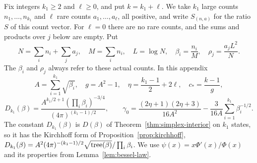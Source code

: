 Fix integers $k_1\ge2$ and $\ell\ge0$, and put $k=k_1+\ell$. We take $k_1$ large
counts $n_1,\ldots,n_{k_1}$ and $\ell$ rare counts $a_1,\ldots,a_\ell$, all
positive, and write $S_{(n,a)}$ for the ratio $S$ of this count vector. For
$\ell=0$ there are no rare counts, and the sums and products over $j$ below are
empty. Put
\[
N=\sum_in_i+\sum_ja_j,\quad M=\sum_in_i,\quad
L=\log N,\quad \beta_i=\frac{n_i}{M},\quad
\rho_j=\frac{a_jL^2}{N}.
\]
The $\beta_i$ and $\rho_j$ always refer to these actual counts. In this
appendix
\[
A=\sum_{i=1}^{k_1}\sqrt{\beta_i},\quad g=A^2-1,\quad
\eta=\frac{k_1-1}{2}+2\ell,\quad c_*=\frac{k-1}g,
\]
\[
D_{k_1}(\beta)=\frac{A^{k_1/2+1}(\prod_i\beta_i)^{-3/4}}
{(4\pi)^{(k_1-1)/2}},\qquad
\gamma_0=\frac{(2\eta+1)(2\eta+3)}{16A^2}-\frac{3}{16A}\sum_{i=1}^{k_1}\beta_i^{-1/2}.
\]
The constant $D_{k_1}(\beta)$ is $D(\beta)$ of
Theorem~\ref{thm:simplex-interior} on $k_1$ states, so it has the Kirchhoff
form of Proposition~\ref{prop:kirchhoff},
$D_{k_1}(\beta)=A^2(4\pi)^{-(k_1-1)/2}\sqrt{\operatorname{tree}(\beta)}/\prod_i\beta_i$. We use
$\psi(x)=x\Phi'(x)/\Phi(x)$ and its properties from
Lemma~\ref{lem:bessel-law}.


